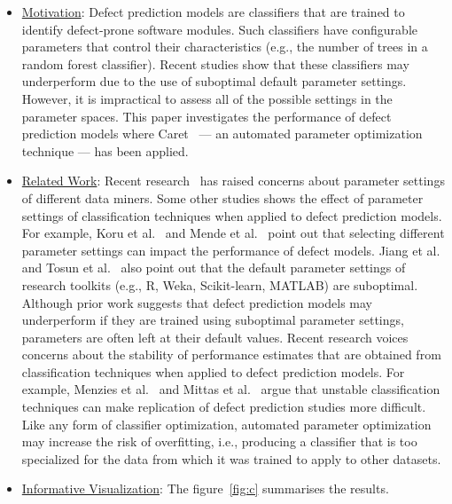 \documentclass[conference]{IEEEtran}
\begin{document}
\begin{itemize}
    \item \underline{Motivation}: Defect prediction models are classifiers that are trained to identify defect-prone software modules. Such classifiers have configurable parameters that control their characteristics (e.g., the number of trees in a random forest classifier). Recent studies show that these classifiers may underperform due to the use of suboptimal default parameter settings. However, it is impractical to assess all of the possible settings in the parameter spaces. This paper investigates the performance of defect prediction models where Caret~\cite{kuhn2015caret} — an automated parameter optimization technique — has been applied.
    \item \underline{Related Work}: Recent research~\cite{fu2016tuning,agrawal2016wrong} has raised concerns about parameter settings of different data miners. Some other studies shows the effect of parameter settings of classification techniques when applied to defect prediction models. For example, Koru et al.~\cite{koru2005investigation} and Mende et al.~\cite{mende2010replication} point out that selecting different parameter settings can impact the performance of defect models. Jiang et al.~\cite{jiang2008can} and Tosun et al.~\cite{tosun2009reducing} also point out that the default parameter settings of research toolkits (e.g., R, Weka, Scikit-learn, MATLAB) are suboptimal. Although prior work suggests that defect prediction models may underperform if they are trained using suboptimal parameter settings, parameters are often left at their default values. Recent research voices concerns about the stability of performance estimates that are obtained from classification techniques when applied to defect prediction models. For example, Menzies et al.~\cite{menzies2012special} and Mittas et al.~\cite{mittas2013ranking} argue that unstable classification techniques can make replication of defect prediction studies more difficult. Like any form of classifier optimization, automated parameter optimization may increase the risk of overfitting, i.e., producing a classifier that is too specialized for the data from which it was trained to apply to other datasets. 
    \item \underline{Informative Visualization}: The figure~\ref{fig:c} summarises the results.
\end{itemize}
\end{document}
